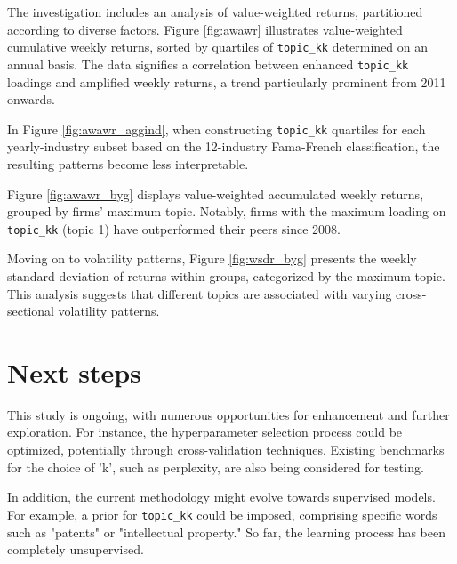 \documentclass[12pt, letterpaper]{article}
\begin{document}
The investigation includes an analysis of value-weighted returns, partitioned according to diverse factors. Figure \ref{fig:awawr} illustrates value-weighted cumulative weekly returns, sorted by quartiles of \texttt{topic\_kk} determined on an annual basis. The data signifies a correlation between enhanced \texttt{topic\_kk} loadings and amplified weekly returns, a trend particularly prominent from 2011 onwards.


In Figure \ref{fig:awawr_aggind}, when constructing \texttt{topic\_kk} quartiles for each yearly-industry subset based on the 12-industry Fama-French classification, the resulting patterns become less interpretable.


Figure \ref{fig:awawr_byg} displays value-weighted accumulated weekly returns, grouped by firms' maximum topic. Notably, firms with the maximum loading on \texttt{topic\_kk} (topic 1) have outperformed their peers since 2008.


Moving on to volatility patterns, Figure \ref{fig:wsdr_byg} presents the weekly standard deviation of returns within groups, categorized by the maximum topic. This analysis suggests that different topics are associated with varying cross-sectional volatility patterns.


\section{Next steps}

This study is ongoing, with numerous opportunities for enhancement and further exploration. For instance, the hyperparameter selection process could be optimized, potentially through cross-validation techniques. Existing benchmarks for the choice of 'k', such as perplexity, are also being considered for testing.

In addition, the current methodology might evolve towards supervised models. For example, a prior for \texttt{topic\_kk} could be imposed, comprising specific words such as "patents" or "intellectual property." So far, the learning process has been completely unsupervised.
\end{document}
